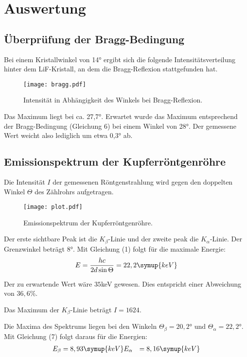 \section{Auswertung}
\label{sec:Auswertung}

\subsection{Überprüfung der Bragg-Bedingung}

Bei einem Kristallwinkel von 14° ergibt sich die folgende Intensitätsverteilung
hinter dem LiF-Kristall, an dem die Bragg-Reflexion stattgefunden hat.

\begin{figure}
  \centering
  \texttt{[image: bragg.pdf]}
  \caption{Intensität in Abhängigkeit des Winkels bei Bragg-Reflexion.}
  \label{fig:bragg}
\end{figure}

Das Maximum liegt bei ca. 27,7°. Erwartet wurde das Maximum entsprechend der
Bragg-Bedingung (Gleichung 6) bei einem Winkel von 28°. Der gemessene Wert weicht
also lediglich um etwa 0,3° ab.


\subsection{Emissionspektrum der Kupferröntgenröhre}

Die Intensität $I$ der gemessenen Röntgenstrahlung wird gegen den doppelten Winkel $\Theta$ des Zählrohrs aufgetragen.

\begin{figure}[H]
  \centering
  \texttt{[image: plot.pdf]}
  \caption{Emissionspektrum der Kupferröntgenröhre.}
  \label{fig:plot}
\end{figure}

Der erste sichtbare Peak ist die $K_{\beta}$-Linie und der zweite peak die $K_{\alpha}$-Linie.
Der Grenzwinkel beträgt $8$°.
Mit Gleichung (1) folgt für die maximale Energie:
\begin{equation}
  E = \frac{hc}{2d \sin{\Theta}} = 22,2 \symup{keV}
\end{equation}

Der zu erwartende Wert wäre $35$keV gewesen.
Dies entspricht einer Abweichung von $36,6 \%$.

Das Maximum der $K_{\beta}$-Linie beträgt $I=1624$.

Die Maxima des Spektrums liegen bei den Winkeln $\Theta_{\beta} = 20,2°$ und $\Theta_{\alpha} = 22,2°$.
Mit Gleichung (7) folgt daraus für die Energien:
\begin{align*}
  E_{\beta} &= 8,93 \symup{keV}
  E_{\alpha} &= 8,16 \symup{keV}
\end{align*}

